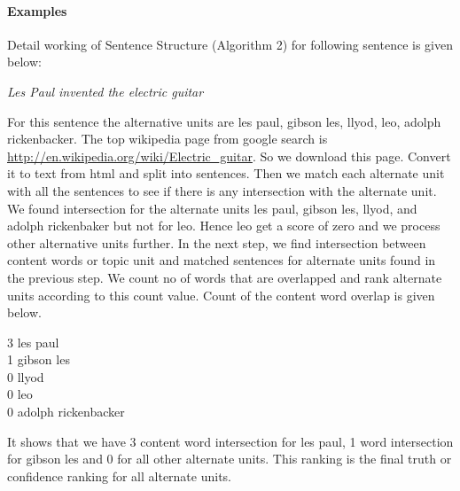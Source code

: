 \documentclass[11pt]{article}
\begin{document}
\paragraph{Examples}
Detail working of Sentence Structure (Algorithm 2) for following sentence is given below:

\emph{Les Paul invented the electric guitar}

For this sentence the alternative units are les paul, gibson les, llyod, leo, adolph rickenbacker. The top wikipedia page from google search is \url{http://en.wikipedia.org/wiki/Electric_guitar}. So we download this page. Convert it to text from html and split into sentences. Then we match each alternate unit with all the sentences to see if there is any intersection with the alternate unit. We found intersection for the alternate units les paul, gibson les, llyod, and adolph rickenbaker but not for leo. Hence leo get a score of zero and we process other alternative units further. In the next step, we find intersection between content words or topic unit and matched sentences for alternate units found in the previous step. We count no of words that are overlapped and rank alternate units according to this count value. Count of the content word overlap is given below.

3 les paul\\
1 gibson les\\
0 llyod\\
0 leo\\
0 adolph rickenbacker

 It shows that we have 3 content word intersection for les paul, 1 word intersection for gibson les and 0 for all other alternate units. This ranking is the final truth or confidence ranking for all alternate units. 
 
\end{document}

